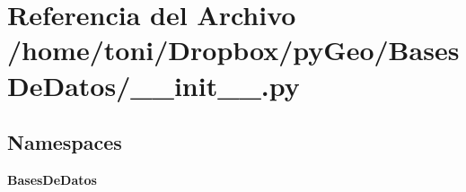 \section{Referencia del Archivo /home/toni/\-Dropbox/py\-Geo/\-Bases\-De\-Datos/\-\_\-\-\_\-init\-\_\-\-\_\-.py}
\label{BasesDeDatos_2____init_____8py}
\subsection*{Namespaces}
\begin{DoxyCompactItemize}
\item 
{\bf Bases\-De\-Datos}
\end{DoxyCompactItemize}
